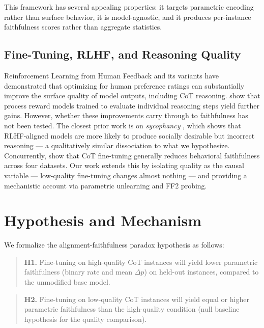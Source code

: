 \documentclass[11pt]{article}
\begin{document}
This framework has several appealing properties: it targets parametric
encoding rather than surface behavior, it is model-agnostic, and it produces
per-instance faithfulness scores rather than aggregate statistics.

\subsection{Fine-Tuning, RLHF, and Reasoning Quality}

Reinforcement Learning from Human Feedback \citep{ouyang2022rlhf} and its
variants have demonstrated that optimizing for human preference ratings can
substantially improve the surface quality of model outputs, including CoT
reasoning. \citet{lightman2023prm} show that process reward models trained to
evaluate individual reasoning steps yield further gains. However, whether
these improvements carry through to faithfulness has not been tested. The
closest prior work is on \emph{sycophancy} \citep{perez2022sycophancy}, which
shows that RLHF-aligned models are more likely to produce socially desirable
but incorrect reasoning --- a qualitatively similar dissociation to what we
hypothesize.
Concurrently, \citet{lobo2025finetuning} show that CoT fine-tuning generally
reduces behavioral faithfulness across four datasets. Our work extends this by
isolating quality as the causal variable --- low-quality fine-tuning changes
almost nothing --- and providing a mechanistic account via parametric unlearning
and FF2 probing.

\section{Hypothesis and Mechanism}
\label{sec:hypothesis}

We formalize the alignment-faithfulness paradox hypothesis as follows:

\begin{quote}
\textbf{H1.} Fine-tuning on high-quality CoT instances will yield lower
  parametric faithfulness (binary rate and mean $\Delta p$) on held-out
  instances, compared to the unmodified base model.
\end{quote}

\begin{quote}
\textbf{H2.} Fine-tuning on low-quality CoT instances will yield equal or
  higher parametric faithfulness than the high-quality condition (null
  baseline hypothesis for the quality comparison).
\end{quote}
\end{document}

